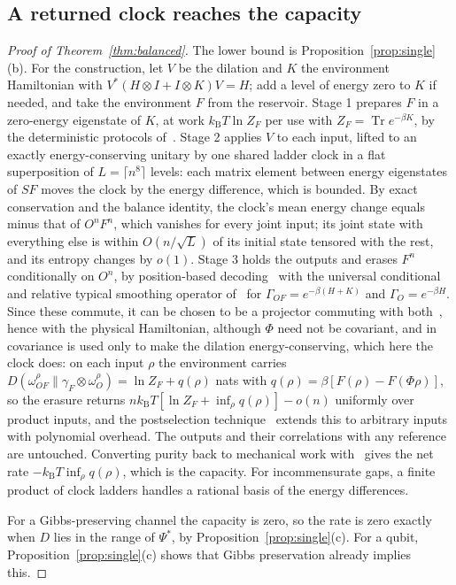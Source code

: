 \documentclass[11pt]{article}
\theoremstyle{definition}
\theoremstyle{remark}
\newcommand{\Tr}{\operatorname{Tr}}
\newcommand{\kB}{k_{\mathrm B}}
\begin{document}
\subsection{A returned clock reaches the capacity}\label{pf:balanced}

\begin{proof}[Proof of Theorem~\ref{thm:balanced}]
The lower bound is Proposition~\ref{prop:single}(b). For the construction, let $V$ be the dilation and $K$ the environment Hamiltonian with $V^*(H\otimes I+I\otimes K)V=H$; add a level of energy zero to $K$ if needed, and take the environment $F$ from the reservoir. Stage 1 prepares $F$ in a zero-energy eigenstate of $K$, at work $\kB T\ln Z_F$ per use with $Z_F=\Tr e^{-\beta K}$, by the deterministic protocols of~\cite{HorodeckiOppenheim13}. Stage 2 applies $V$ to each input, lifted to an exactly energy-conserving unitary by one shared ladder clock in a flat superposition of $L=\lceil n^8\rceil$ levels: each matrix element between energy eigenstates of $S F$ moves the clock by the energy difference, which is bounded. By exact conservation and the balance identity, the clock's mean energy change equals minus that of $O^nF^n$, which vanishes for every joint input; its joint state with everything else is within $O(n/\sqrt L)$ of its initial state tensored with the rest, and its entropy changes by $o(1)$. Stage 3 holds the outputs and erases $F^n$ conditionally on $O^n$, by position-based decoding~\cite[Prop.~7.1]{FBB21} with the universal conditional and relative typical smoothing operator of~\cite[Prop.~6.1]{FBB21} for $\Gamma_{OF}=e^{-\beta(H+K)}$ and $\Gamma_O=e^{-\beta H}$. Since these commute, it can be chosen to be a projector commuting with both~\cite[Prop.~6.1]{FBB21}, hence with the physical Hamiltonian, although $\Phi$ need not be covariant, and in~\cite[Thm.~7.1]{FBB21} covariance is used only to make the dilation energy-conserving, which here the clock does: on each input $\rho$ the environment carries $D(\omega^\rho_{OF}\|\gamma_F\otimes\omega^\rho_O)=\ln Z_F+q(\rho)$ nats with $q(\rho)=\beta[F(\rho)-F(\Phi\rho)]$, so the erasure returns $n\kB T[\ln Z_F+\inf_\rho q(\rho)]-o(n)$ uniformly over product inputs, and the postselection technique~\cite{ChristandlKonigRenner09} extends this to arbitrary inputs with polynomial overhead. The outputs and their correlations with any reference are untouched. Converting purity back to mechanical work with~\cite{HorodeckiOppenheim13} gives the net rate $-\kB T\inf_\rho q(\rho)$, which is the capacity. For incommensurate gaps, a finite product of clock ladders handles a rational basis of the energy differences.

For a Gibbs-preserving channel the capacity is zero, so the rate is zero exactly when $D$ lies in the range of $\Psi^*$, by Proposition~\ref{prop:single}(c). For a qubit, Proposition~\ref{prop:single}(c) shows that Gibbs preservation already implies this.
\end{proof}
\end{document}
